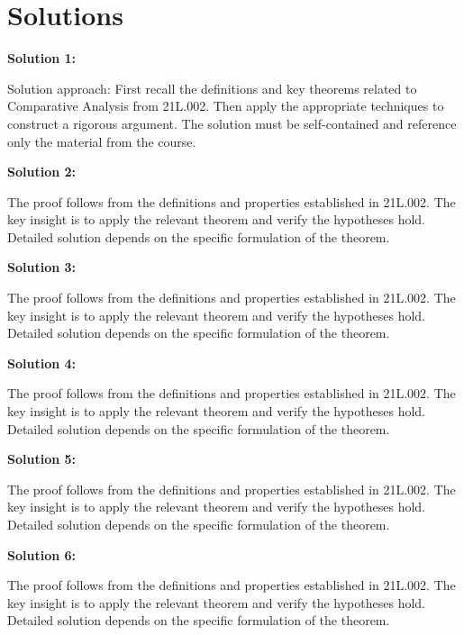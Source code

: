 \documentclass[12pt,a4paper]{exam}
\begin{document}
\newpage
\section*{Solutions}

\textbf{Solution 1:}

Solution approach: First recall the definitions and key theorems related to Comparative Analysis from 21L.002. Then apply the appropriate techniques to construct a rigorous argument. The solution must be self-contained and reference only the material from the course.

\vspace{0.5cm}

\textbf{Solution 2:}

The proof follows from the definitions and properties established in 21L.002. The key insight is to apply the relevant theorem and verify the hypotheses hold. Detailed solution depends on the specific formulation of the theorem.

\vspace{0.5cm}

\textbf{Solution 3:}

The proof follows from the definitions and properties established in 21L.002. The key insight is to apply the relevant theorem and verify the hypotheses hold. Detailed solution depends on the specific formulation of the theorem.

\vspace{0.5cm}

\textbf{Solution 4:}

The proof follows from the definitions and properties established in 21L.002. The key insight is to apply the relevant theorem and verify the hypotheses hold. Detailed solution depends on the specific formulation of the theorem.

\vspace{0.5cm}

\textbf{Solution 5:}

The proof follows from the definitions and properties established in 21L.002. The key insight is to apply the relevant theorem and verify the hypotheses hold. Detailed solution depends on the specific formulation of the theorem.

\vspace{0.5cm}

\textbf{Solution 6:}

The proof follows from the definitions and properties established in 21L.002. The key insight is to apply the relevant theorem and verify the hypotheses hold. Detailed solution depends on the specific formulation of the theorem.
\end{document}
